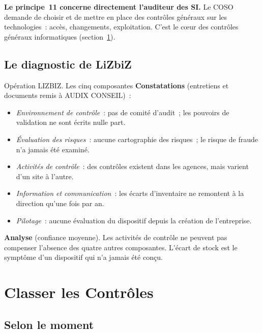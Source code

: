 \begin{boxinfo}
\textbf{Le principe~11 concerne directement l'auditeur des SI.} Le COSO
demande de choisir et de mettre en place des contrôles généraux sur les
technologies~: accès, changements, exploitation. C'est le cœur des
contrôles généraux informatiques (section~\ref{sec:c02-types}).
\end{boxinfo}

\subsection{Le diagnostic de LiZbiZ}

\begin{boxscenario}{Opération LIZBIZ. Les cinq composantes}
\textbf{Constatations} (entretiens et documents remis à AUDIX CONSEIL)~:
\begin{itemize}
    \item \emph{Environnement de contrôle}~: pas de comité d'audit~; les
          pouvoirs de validation ne sont écrits nulle part.
    \item \emph{Évaluation des risques}~: aucune cartographie des risques~;
          le risque de fraude n'a jamais été examiné.
    \item \emph{Activités de contrôle}~: des contrôles existent dans les
          agences, mais varient d'un site à l'autre.
    \item \emph{Information et communication}~: les écarts d'inventaire ne
          remontent à la direction qu'une fois par an.
    \item \emph{Pilotage}~: aucune évaluation du dispositif depuis la
          création de l'entreprise.
\end{itemize}

\textbf{Analyse} (confiance moyenne). Les activités de contrôle ne peuvent
pas compenser l'absence des quatre autres composantes. L'écart de stock est
le symptôme d'un dispositif qui n'a jamais été conçu.
\end{boxscenario}

\section{Classer les Contrôles}
\label{sec:c02-types}

\subsection{Selon le moment}

